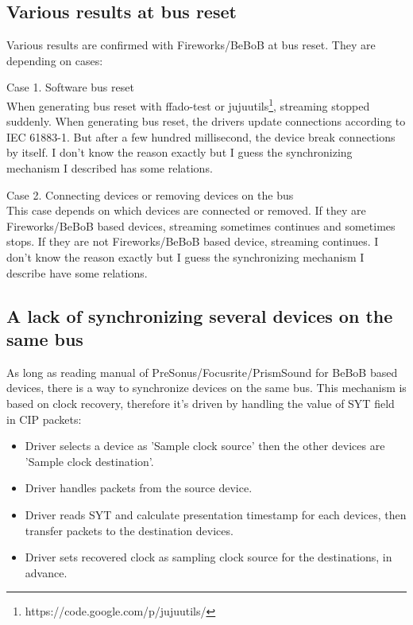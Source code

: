 \documentclass[onecolumn]{jarticle}
\begin{document}
\subsection{Various results at bus reset}
Various results are confirmed with Fireworks/BeBoB at bus reset. They are depending on cases:
\begin{description}
\item{Case 1. Software bus reset} \mbox{} \\
When generating bus reset with ffado-test or jujuutils\footnote{https://code.google.com/p/jujuutils/}, streaming stopped suddenly. When generating bus reset, the drivers update connections according to IEC 61883-1. But after a few hundred millisecond, the device break connections by itself. I don't know the reason exactly but I guess the synchronizing mechanism I described has some relations.
\item{Case 2. Connecting devices or removing devices on the bus} \mbox{} \\
This case depends on which devices are connected or removed. If they are Fireworks/BeBoB based devices, streaming sometimes continues and sometimes stops. If they are not Fireworks/BeBoB based device, streaming continues. I don't know the reason exactly but I guess the synchronizing mechanism I describe have some relations. 
\end{description}

\subsection{A lack of synchronizing several devices on the same bus}
As long as reading manual of PreSonus/Focusrite/PrismSound for BeBoB based devices, there is a way to synchronize devices on the same bus. This mechanism is based on clock recovery, therefore it's driven by handling the value of SYT field in CIP packets:
\begin{itemize}
\item Driver selects a device as 'Sample clock source' then the other devices are 'Sample clock destination'.
\item Driver handles packets from the source device.
\item Driver reads SYT and calculate presentation timestamp for each devices, then transfer packets to the destination devices.
\item Driver sets recovered clock as sampling clock source for the destinations, in advance.
\end{itemize}
\end{document}
